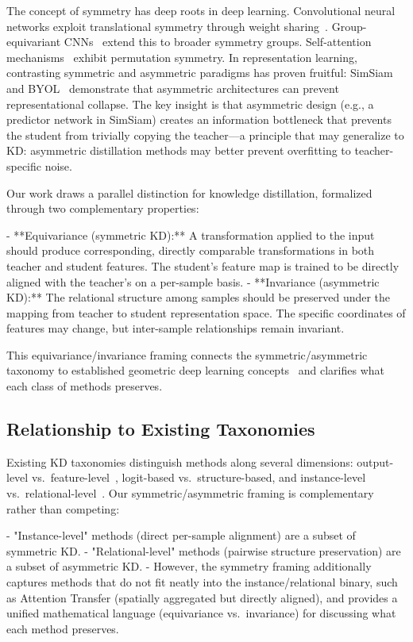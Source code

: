 \documentclass[symmetry,article,submit,pdftex,moreauthors]{Definitions/mdpi}
\begin{document}
The concept of symmetry has deep roots in deep learning. Convolutional neural networks exploit translational symmetry through weight sharing~\cite{ref13}. Group-equivariant CNNs~\cite{ref14} extend this to broader symmetry groups. Self-attention mechanisms~\cite{ref15} exhibit permutation symmetry. In representation learning, contrasting symmetric and asymmetric paradigms has proven fruitful: SimSiam~\cite{ref16} and BYOL~\cite{ref17} demonstrate that asymmetric architectures can prevent representational collapse. The key insight is that asymmetric design (e.g., a predictor network in SimSiam) creates an information bottleneck that prevents the student from trivially copying the teacher---a principle that may generalize to KD: asymmetric distillation methods may better prevent overfitting to teacher-specific noise.

Our work draws a parallel distinction for knowledge distillation, formalized through two complementary properties:

- **Equivariance (symmetric KD):** A transformation applied to the input should produce corresponding, directly comparable transformations in both teacher and student features. The student's feature map is trained to be directly aligned with the teacher's on a per-sample basis.
- **Invariance (asymmetric KD):** The relational structure among samples should be preserved under the mapping from teacher to student representation space. The specific coordinates of features may change, but inter-sample relationships remain invariant.

This equivariance/invariance framing connects the symmetric/asymmetric taxonomy to established geometric deep learning concepts~\cite{ref14} and clarifies what each class of methods preserves.

\subsection{Relationship to Existing Taxonomies}

Existing KD taxonomies distinguish methods along several dimensions: output-level vs.~feature-level~\cite{ref8,ref9}, logit-based vs.~structure-based, and instance-level vs.~relational-level~\cite{ref12}. Our symmetric/asymmetric framing is complementary rather than competing:

- "Instance-level" methods (direct per-sample alignment) are a subset of symmetric KD.
- "Relational-level" methods (pairwise structure preservation) are a subset of asymmetric KD.
- However, the symmetry framing additionally captures methods that do not fit neatly into the instance/relational binary, such as Attention Transfer (spatially aggregated but directly aligned), and provides a unified mathematical language (equivariance vs.~invariance) for discussing what each method preserves.
\end{document}
